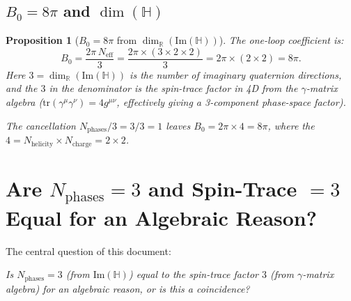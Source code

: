 \documentclass[12pt,a4paper]{article}
\newtheorem{proposition}[theorem]{Proposition}
\theoremstyle{definition}
\theoremstyle{remark}
\begin{document}
\subsection{$B_0 = 8\pi$ and $\dim(\mathbb{H})$}

\begin{proposition}[$B_0 = 8\pi$ from $\dim_{\mathbb{R}}(\mathrm{Im}(\mathbb{H}))$]
\label{prop:B0}
The one-loop coefficient is:
\begin{equation}
  B_0 = \frac{2\pi\,N_{\mathrm{eff}}}{3}
      = \frac{2\pi\times(3\times 2\times 2)}{3}
      = 2\pi\times(2\times 2)
      = 8\pi.
\label{eq:B0_detail}
\end{equation}
Here $3 = \dim_{\mathbb{R}}(\mathrm{Im}(\mathbb{H}))$ is the number of
imaginary quaternion directions, and the $3$ in the denominator is the
spin-trace factor in 4D from the $\gamma$-matrix algebra ($\mathrm{tr}(\gamma^\mu\gamma^\nu)
= 4 g^{\mu\nu}$, effectively giving a 3-component phase-space factor).

The cancellation $N_{\mathrm{phases}} / 3 = 3/3 = 1$ leaves
$B_0 = 2\pi\times 4 = 8\pi$,
where the $4 = N_{\mathrm{helicity}}\times N_{\mathrm{charge}} = 2\times 2$.
\end{proposition}

\section{Are $N_{\mathrm{phases}} = 3$ and Spin-Trace $= 3$ Equal for
         an Algebraic Reason?}
\label{sec:algebraic_reason}

The central question of this document:
\begin{center}
\textit{Is $N_{\mathrm{phases}} = 3$ (from $\mathrm{Im}(\mathbb{H})$) equal to the
  spin-trace factor $3$ (from $\gamma$-matrix algebra) for an algebraic reason,
  or is this a coincidence?}
\end{center}
\end{document}
